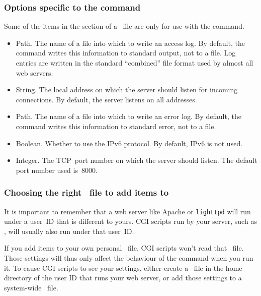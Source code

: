 \subsubsection{Options specific to the  command}

Some of the items in the  section of a \hgrc\ file are
only for use with the  command.
\begin{itemize}
\item[\rcitem{web}{accesslog}] Path.  The name of a file into which to
  write an access log.  By default, the  command writes
  this information to standard output, not to a file.  Log entries are
  written in the standard ``combined'' file format used by almost all
  web servers.
\item[\rcitem{web}{address}] String.  The local address on which the
  server should listen for incoming connections.  By default, the
  server listens on all addresses.
\item[\rcitem{web}{errorlog}] Path.  The name of a file into which to
  write an error log.  By default, the  command writes this
  information to standard error, not to a file.
\item[\rcitem{web}{ipv6}] Boolean.  Whether to use the IPv6 protocol.
  By default, IPv6 is not used. 
\item[\rcitem{web}{port}] Integer.  The TCP~port number on which the
  server should listen.  The default port number used is~8000.
\end{itemize}

\subsubsection{Choosing the right \hgrc\ file to add 
  items to}

It is important to remember that a web server like Apache or
\texttt{lighttpd} will run under a user~ID that is different to yours.
CGI scripts run by your server, such as , will
usually also run under that user~ID.

If you add  items to your own personal \hgrc\ file, CGI
scripts won't read that \hgrc\ file.  Those settings will thus only
affect the behaviour of the  command when you run it.  To
cause CGI scripts to see your settings, either create a \hgrc\ file in
the home directory of the user ID that runs your web server, or add
those settings to a system-wide \hgrc\ file.


